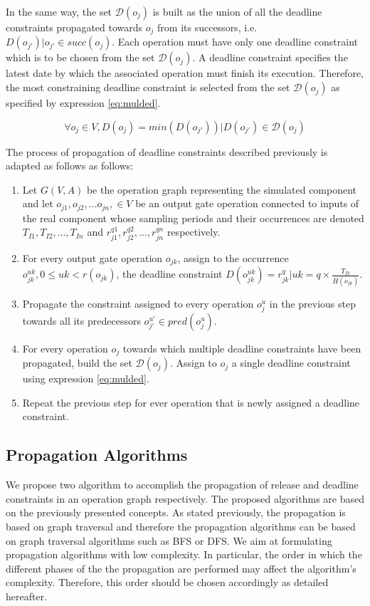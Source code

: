 In the same way, the set $\mathcal{D}(o_j)$ is built as the union of all the deadline constraints propagated towards $o_j$ from its successors, i.e. $D(o_{j'}) | o_{j'} \in succ(o_j)$. Each operation must have only one deadline constraint which is to be chosen from the set $\mathcal{D}(o_j)$. A deadline constraint specifies the latest date by which the associated operation must finish its execution. Therefore, the most constraining deadline constraint is selected from the set $\mathcal{D}(o_j)$ as specified by expression \ref{eq:mulded}.

\begin{equation}
\forall o_j \in V, D(o_j) = min(D(o_{j'})) | D(o_{j'}) \in \mathcal{D}(o_j) 
\label{eq:mulded}
\end{equation}

The process of propagation of deadline constraints described previously is adapted as follows as follows:

\begin{enumerate}
\item Let $G(V,A)$ be the operation graph representing the simulated component and let $o_{j1}, o_{j2}, \ldots o_{jn},\in  V$ be an output gate operation connected to inputs of the real component whose sampling periods and their occurrences are denoted $T_{I1}, T_{I2}, \ldots, T_{In}$ and $r_{j1}^{q1}, r_{j2}^{q2}, \ldots, r_{jn}^{qn}$ respectively.
\item For every output gate operation $o_{jk}$, assign to the occurrence $o_{jk}^{uk}, 0 \leq uk < r(o_{jk})$, the deadline constraint $D(o_{jk}^{uk}) = r_{jk}^q | uk = q \times \frac{T_{Ik}}{H(o_{jk})}$.
\item Propagate the constraint assigned to every operation $o_j^u$ in the previous step towards all its predecessors $o_{j'}^{u'} \in pred(o_j^u)$.
\item For every operation $o_j$ towards which multiple deadline constraints have been propagated, build the set $\mathcal{D}(o_j)$. Assign to $o_j$ a single deadline constraint using expression \ref{eq:mulded}.
\item Repeat the previous step for ever operation that is newly assigned a deadline constraint.
\end{enumerate}

\subsection{Propagation Algorithms}

We propose two algorithm to accomplish the propagation of release and deadline constraints in an operation graph respectively. The proposed algorithms are based on the previously presented concepts. As stated previously, the propagation is based on graph traversal and therefore the propagation algorithms can be based on graph traversal algorithms such as BFS or DFS. We aim at formulating propagation algorithms with low complexity. In particular, the order in which the different phases of the the propagation are performed may affect the algorithm's complexity. Therefore, this order should be chosen accordingly as detailed hereafter.

